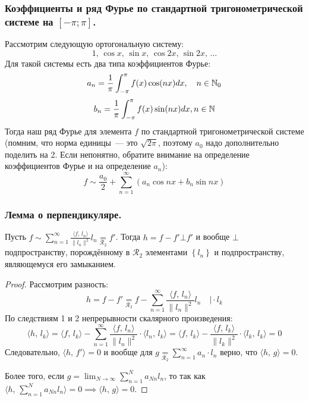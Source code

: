 \subsubsection{Коэффициенты и ряд Фурье по стандартной тригонометрической системе на $[-\pi; \pi]$.}
Рассмотрим следующую ортогональную систему:
\[1,\, \cos x,\, \sin x,\, \cos 2x,\, \sin 2x,\, \ldots \]
Для такой системы есть два типа коэффициентов Фурье:
\[a_n = \frac{1}{\pi} \int_{-\pi}^\pi f(x) \cos (nx) dx, \quad n \in \mathbb{N}_0\]
\[b_n = \frac{1}{\pi} \int_{-\pi}^\pi f(x) \sin (nx) dx, n \in \mathbb{N}\]
Тогда наш ряд Фурье для элемента $f$ по стандартной тригонометрической системе (помним, что норма единицы~--- это $\sqrt{2\pi}$, поэтому $a_0$ надо дополнительно поделить на 2. Если непонятно, обратите внимание на определение коэффициентов Фурье и на определение $a_n$):
\[f \sim \frac{a_0}{2} + \sum_{n=1}^\infty \left( a_n \cos nx + b_n \sin nx \right)\]

\subsubsection{Лемма о перпендикуляре.}
\begin{theorem*}
    Пусть $f \sim \sum_{n=1}^\infty \frac{\langle f,\, l_n \rangle}{\| l_n \|^2} l_n \underset{\mathcal{R}_2}{=} f'$. Тогда $h = f - f' \bot f'$ и вообще $\bot$ подпространству, порождённому в $\mathcal{R}_2$ элементами $\left\{ l_n \right\}$ и подпространству, являющемуся его замыканием.
\end{theorem*}
\begin{proof}
    Рассмотрим разность:
    \[h = f - f' \underset{\mathcal{R}_2}{=} f - \sum_{n=1}^\infty \frac{\langle f,\, l_n \rangle}{\| l_n \|^2} l_n \quad \Big| \cdot l_k\]
    По следствиям 1 и 2 непрерывности скалярного произведения:
    \[\langle h,\, l_k \rangle = \langle f,\, l_k \rangle  - \sum_{n=1}^\infty \frac{\langle f,\, l_n \rangle}{\| l_n \|^2} \cdot \langle l_n,\, l_k \rangle = \langle f,\, l_k \rangle - \frac{\langle f ,\, l_k \rangle}{\| l_k \|^2} \cdot \langle l_k,\, l_k \rangle = 0\]
    Следовательно, $\langle h,\, f' \rangle = 0$ и вообще для $g \underset{\mathcal{R}_2}{=} \sum_{n=1}^\infty a_n \cdot l_n$ верно, что $\langle h,\, g \rangle = 0$.

    Более того, если $g = \lim_{N \to \infty} \sum_{n = 1}^N a_{Nn} l_n$, то так как $\langle h,\, \sum_{n=1}^N a_{Nn} l_n \rangle = 0 \implies \langle h,\, g \rangle = 0$.
\end{proof}

